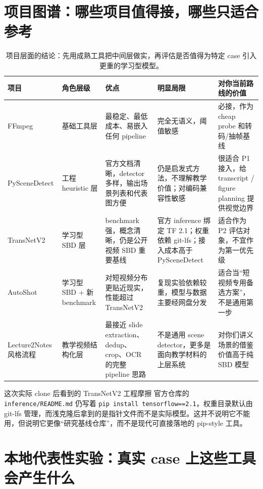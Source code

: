 \documentclass[a4paper]{article}
\begin{document}
\section{项目图谱：哪些项目值得接，哪些只适合参考}

\begin{table}[H]
\centering
\small
\begin{tabularx}{\textwidth}{p{2.2cm}p{2.2cm}p{3.2cm}p{3.0cm}Y}
\toprule
项目 & 角色层级 & 优点 & 明显局限 & 对你当前路线的价值 \\
\midrule
FFmpeg & 基础工具层 & 最稳定、最低成本、易嵌入任何 pipeline & 完全无语义，阈值敏感 & 必接，作为 cheap probe 和转码/抽帧基线 \\
PySceneDetect & 工程 heuristic 层 & 官方文档清晰，detector 多样，输出场景列表和代表图方便 & 仍是启发式方法，不理解教学价值；对编码兼容性敏感 & 很适合 P1 接入，给 transcript / figure planning 提供视觉边界 \\
TransNetV2 & 学习型 SBD 层 & benchmark 强，概念清晰，仍是公开视频 SBD 重要基线 & 官方 inference 绑定 TF 2.1；权重依赖 git-lfs；接入成本高于 PySceneDetect & 适合作为 P2 评估对象，不宜作为第一优先级 \\
AutoShot & 学习型 SBD + 新 benchmark & 对短视频分布更贴近现实，性能超过 TransNetV2 & 复现实验依赖较重，模型与数据主要经网盘分发 & 适合当“短视频专用备选方案”，不是通用第一步 \\
Lecture2Notes 风格流程 & 教学视频结构化层 & 最接近 slide extraction、dedup、crop、OCR 的完整 pipeline 思路 & 不是通用 scene detector，更多是面向教学材料的上层系统 & 对你们讲义场景的借鉴价值高于纯 SBD 模型 \\
\bottomrule
\end{tabularx}
\caption{项目层面的结论：先用成熟工具把中间层做实，再评估是否值得为特定 case 引入更重的学习型模型。}
\end{table}

\begin{evidencebox}{这次实际 clone 后看到的 TransNetV2 工程摩擦}
官方仓库的 \texttt{inference/README.md} 仍写着 \texttt{pip install tensorflow==2.1}，权重目录默认由 git-lfs 管理，而浅克隆后拿到的是指针文件而不是实际模型。这并不说明它不能用，但说明它更像“研究基线仓库”，而不是现代可直接落地的 pip-style 工具。
\end{evidencebox}

\section{本地代表性实验：真实 case 上这些工具会产生什么}
\end{document}

